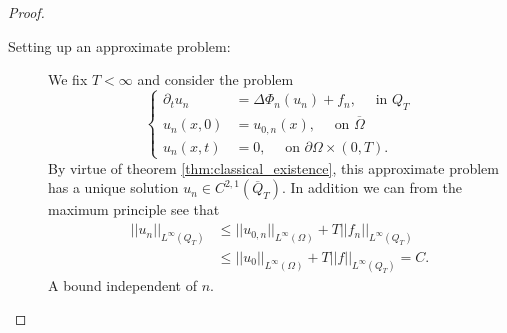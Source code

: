 \documentclass[11pt, a4paper]{article}
\begin{document}
\begin{proof}

\begin{description}
	\item[Setting up an approximate problem:] We fix $T<\infty$ and consider the problem
		\begin{equation}
		\label{approximate_problem}
			\begin{cases}
			\partial_t u_n &= \Delta\Phi_n(u_n) + f_n, \quad \text{ in } Q_T \\
			u_n(x,0) &= u_{0,n}(x),	\quad \text{ on } \overline{\Omega} \\
			u_n(x,t) &= 0, \quad \text{ on }  \partial \Omega \times (0,T).
			\end{cases}
		\end{equation}			
	By virtue of theorem \ref{thm:classical_existence}, this approximate problem has a unique solution $u_n \in C^{2,1}(\overline{Q}_T)$. In addition we can from the maximum principle see that
	\begin{align*}
	||u_n||_{L^\infty(Q_T)} &\leq ||u_{0,n}||_{L^\infty(\Omega)} + T||f_n||_{L^\infty(Q_T)} \\
	&\leq ||u_0||_{L^\infty(\Omega)} + T||f||_{L^\infty(Q_T)} = C.
	\end{align*}
	A bound independent of $n$.
	

\end{description}
\end{proof}
\end{document}
